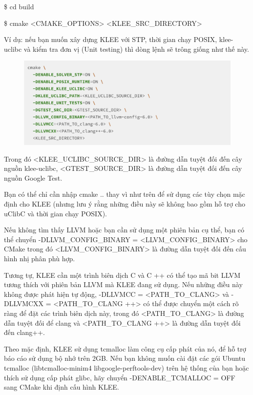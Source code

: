 \documentclass[12pt,a4paper]{article}
\begin{document}
\begin{framed}
\$ cd build

\$ cmake <CMAKE\_OPTIONS> <KLEE\_SRC\_DIRECTORY>
\end{framed}

Ví dụ: nếu bạn muốn xây dựng KLEE với STP, thời gian chạy POSIX, klee-uclibc và kiểm tra đơn vị (Unit testing) thì dòng lệnh sẽ trông giống như thế này.

\begin{figure}[ht]
\begin{center}
\includegraphics[scale=.3]{hinhanh/cmakeklee.png}
\end{center}
\end{figure}

Trong đó <KLEE\_UCLIBC\_SOURCE\_DIR> là đường dẫn tuyệt đối đến cây nguồn klee-uclibc, <GTEST\_SOURCE\_DIR> là đường dẫn tuyệt đối đến cây nguồn Google Test.

Bạn có thể chỉ cần nhập cmake .. thay vì như trên để sử dụng các tùy chọn mặc định cho KLEE (nhưng lưu ý rằng những điều này sẽ không bao gồm hỗ trợ cho uClibC và thời gian chạy POSIX).

Nếu không tìm thấy LLVM hoặc bạn cần sử dụng một phiên bản cụ thể, bạn có thể chuyển -DLLVM\_CONFIG\_BINARY = <LLVM\_CONFIG\_BINARY> cho CMake trong đó <LLVM\_CONFIG\_BINARY> là đường dẫn tuyệt đối đến cấu hình nhị phân phù hợp.

Tương tự, KLEE cần một trình biên dịch C và C ++ có thể tạo mã bit LLVM tương thích với phiên bản LLVM mà KLEE đang sử dụng. Nếu những điều này không được phát hiện tự động, -DLLVMCC = <PATH\_TO\_CLANG> và -DLLVMCXX = <PATH\_TO\_CLANG ++> có thể được chuyển một cách rõ ràng để đặt các trình biên dịch này, trong đó <PATH\_TO\_CLANG> là đường dẫn tuyệt đối để clang và <PATH\_TO\_CLANG ++> là đường dẫn tuyệt đối đến clang++.

Theo mặc định, KLEE sử dụng tcmalloc làm công cụ cấp phát của nó, để hỗ trợ báo cáo sử dụng bộ nhớ trên 2GB. Nếu bạn không muốn cài đặt các gói Ubuntu tcmalloc (libtcmalloc-minim4 libgoogle-perftools-dev) trên hệ thống của bạn hoặc thích sử dụng cấp phát glibc, hãy chuyển -DENABLE\_TCMALLOC = OFF sang CMake khi định cấu hình KLEE.
\end{document}
